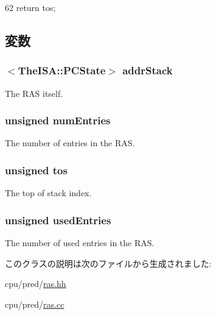 \begin{DoxyCode}
62     { return tos; }
\end{DoxyCode}


\subsection{変数}
\hypertarget{classReturnAddrStack_aabdf6adb15efe8a98ff6da83b4ecb30f}{
\subsubsection[{addrStack}]{$<$TheISA::PCState$>$ {\bf addrStack}}}
\label{classReturnAddrStack_aabdf6adb15efe8a98ff6da83b4ecb30f}
The RAS itself. \hypertarget{classReturnAddrStack_a325de474a9f6652329339d9fc2ea09c0}{
\subsubsection[{numEntries}]{\setlength{\rightskip}{0pt plus 5cm}unsigned {\bf numEntries}}}
\label{classReturnAddrStack_a325de474a9f6652329339d9fc2ea09c0}
The number of entries in the RAS. \hypertarget{classReturnAddrStack_a07d6de7b69e2f068ca2e29a4bda4749a}{
\subsubsection[{tos}]{\setlength{\rightskip}{0pt plus 5cm}unsigned {\bf tos}}}
\label{classReturnAddrStack_a07d6de7b69e2f068ca2e29a4bda4749a}
The top of stack index. \hypertarget{classReturnAddrStack_a7b4de94c51ba4a9701f0914367e0a2db}{
\subsubsection[{usedEntries}]{\setlength{\rightskip}{0pt plus 5cm}unsigned {\bf usedEntries}}}
\label{classReturnAddrStack_a7b4de94c51ba4a9701f0914367e0a2db}
The number of used entries in the RAS. 

このクラスの説明は次のファイルから生成されました:\begin{DoxyCompactItemize}
\item 
cpu/pred/\hyperlink{ras_8hh}{ras.hh}\item 
cpu/pred/\hyperlink{ras_8cc}{ras.cc}\end{DoxyCompactItemize}
